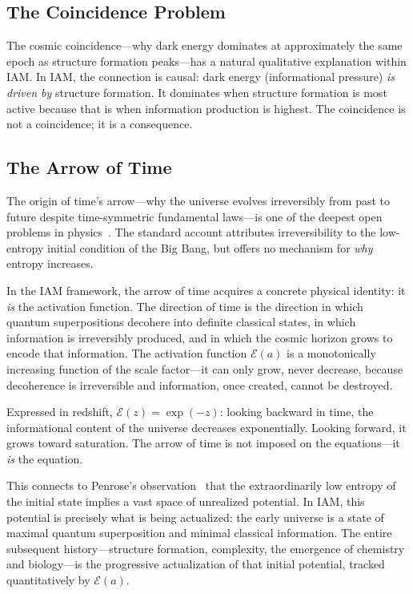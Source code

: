 \documentclass[11pt]{article}
\begin{document}
\subsection{The Coincidence Problem}

The cosmic coincidence---why dark energy dominates at approximately the same
epoch as structure formation peaks---has a natural qualitative explanation
within IAM.  In IAM, the
connection is causal: dark energy (informational pressure) \textit{is driven
by} structure formation.  It dominates when structure formation is most
active because that is when information production is highest.  The
coincidence is not a coincidence; it is a consequence.

\subsection{The Arrow of Time}

The origin of time's arrow---why the universe evolves irreversibly from past
to future despite time-symmetric fundamental
laws---is one of the deepest open problems in
physics~\citep{Penrose1989,Carroll2004}.  The standard account attributes
irreversibility to the low-entropy initial condition of the Big Bang, but
offers no mechanism for \textit{why} entropy increases.

In the IAM framework, the arrow of time acquires a concrete physical
identity: it \textit{is} the activation function.  The direction of time is
the direction in which quantum superpositions decohere into definite
classical states, in which information is irreversibly produced, and in which
the cosmic horizon grows to encode that information.  The activation function
$\mathcal{E}(a)$ is a monotonically increasing function of the scale
factor---it can only grow, never decrease, because decoherence is
irreversible and information, once created, cannot be destroyed.

Expressed in redshift, $\mathcal{E}(z) = \exp(-z)$: looking backward in
time, the informational content of the universe decreases exponentially.
Looking forward, it grows toward saturation.  The arrow of time is not
imposed on the equations---it \textit{is} the equation.

This connects to Penrose's observation~\citep{Penrose1989} that the
extraordinarily low entropy of the initial state implies a vast space of
unrealized potential.  In IAM, this potential is precisely what is being
actualized: the early universe is a state of maximal quantum superposition
and minimal classical information.  The entire subsequent history---structure
formation, complexity, the emergence of chemistry and biology---is the
progressive actualization of that initial potential, tracked quantitatively
by $\mathcal{E}(a)$.
\end{document}
